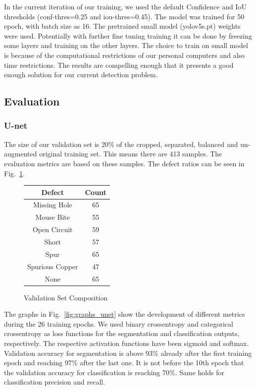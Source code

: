\documentclass[12pt]{article}
\begin{document}
In the current iteration of our training, we used the default Confidence and IoU thresholds (conf-thres=0.25 and iou-thres=0.45). The model was trained for 50 epoch, with batch size as 16. The pretrained small model (yolov5s.pt) weights were used. Potentially with further fine tuning training it can be done by freezing some layers and training on the other layers. The choice to train on small model is because of the computational restrictions of our personal computers and also time restrictions. The results are compelling enough that it presents a good enough solution for our current detection problem.

\clearpage
\newpage

\subsection{Evaluation}

\subsubsection{U-net}

The size of our validation set is 20\% of the cropped, separated, balanced and un-augmented original training set. This means there are 413 samples. The evaluation metrics are based on these samples. The defect ratios can be seen in Fig.~\ref{fig:val_set}.
\begin{figure}[H]
    \begin{center}
        \begin{tabular}{|c|c|}
            \hline
            Defect & Count\\
            \hline
            Missing Hole & 65 \\
            Mouse Bite & 55 \\
            Open Circuit & 59 \\
            Short & 57 \\
            Spur & 65 \\
            Spurious Copper & 47 \\
            None & 65\\
            \hline
        \end{tabular}
    \end{center}
    \caption{Validation Set Composition}
    \label{fig:val_set}
\end{figure}

The graphs in Fig.~\ref{fig:graphs_unet} show the development of different metrics during the 26 training epochs. We used binary crossentropy and categorical crossentropy as loss functions for the segmentation and classification outputs, respectively. The respective activation functions have been sigmoid and softmax. Validation accuracy for segmentation is above 93\% already after the first training epoch and reaching 97\% after the last one. It is not before the 10th epoch that the validation accuracy for classification is reaching 70\%. Same holds for classification precision and recall.
\end{document}

